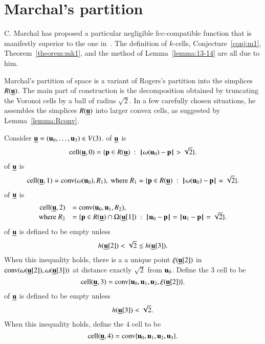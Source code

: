 \section{Marchal's partition}

C. Marchal has proposed a particular negligible fcc-compatible function that is manifestly superior to the one in~\cite{Hales:2006:DCG}.  The definition of $k$-cells, Conjecture~\ref{conj:m1}, Theorem~\ref{theorem:mk1}, and the method of Lemma~\ref{lemma:13-14} are all due to him.
%


Marchal's partition of space is a variant of Rogers's partition into the simplices $R(\bu)$.  The main part of construction is  the decomposition obtained by truncating the Voronoi cells by a ball of radius $\sqrt2$.  In a few carefully chosen situations, he assembles the simplices $R(\bu)$ into larger convex cells, as suggested by Lemma~\ref{lemma:Rconv}.



\begin{definition} Consider $\bu=( \u_0,\ldots, \u_3)\in  V(3)$.
\hfill\break\smallskip  
{} of $\bu$ is
$$
\cell(\bu,0) = \{\p\in R(\bu) \mid \norm{\omega( \u_0)}{\p} > \sqrt2\}.
$$
\bigskip
{} of $\bu$ is 
$$
\cell(\bu,1) = \op{conv}(\omega( \u_0),R_1),\hbox{ where } R_1 = \{\p \in R(\bu) \mid \norm{\omega( \u_0)}{\p}= \sqrt2\}.
$$
%
%
%
\bigskip
{} of $\bu$ is
$$
\begin{array}{rll}
\cell(\bu,2) &= \op{conv}( \u_0, \u_1,R_2),\quad \\
 \text{where } R_2 &= \{\p \in R(\bu)\cap \Omega(\bu[1]) \mid \norm{ \u_0}{\p}=\norm{ \u_1}{\p} =\sqrt2\}.
\end{array}
$$
\bigskip
{} of $\bu$ is defined to be empty unless 
$$
h(\bu[2]) <\sqrt2 \le h(\bu[3]).
$$
When this inequality holds,
there is a a unique point $\xi(\bu[2])$ in
$\op{conv}(\omega(\bu[2]),\omega(\bu[3]))$ at distance exactly $\sqrt2$ from $ \u_0$.  
Define the $3$ cell to be
$$
\cell(\bu,3) = \op{conv}\{ \u_0, \u_1, \u_2,\xi(\bu[2])\}.
$$
\bigskip
{} of $\bu$ is defined to be empty unless
$$
h(\bu[3]) <\sqrt2.
$$
When this inequality holds, define the $4$ cell to be
$$
\cell(\bu,4) = \op{conv}\{ \u_0, \u_1, \u_2, \u_3\}.
$$
\end{definition}
%

